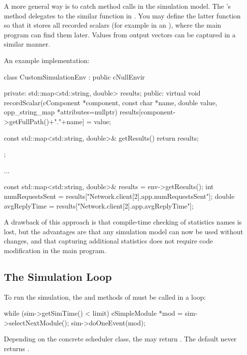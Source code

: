 A more general way is to catch  method calls in the
simulation model. The 's  method
delegates to the similar function in . You may define the
latter function so that it stores all recorded scalars (for example in an
), where the main program can find them later.
Values from output vectors can be captured in a similar manner.

An example implementation:

\begin{cpp}
class CustomSimulationEnv : public cNullEnvir
{
  private:
    std::map<std::string, double> results;
  public:
    virtual void recordScalar(cComponent *component, const char *name,
                              double value, opp_string_map *attributes=nullptr)
    {
       results[component->getFullPath()+"."+name] = value;
    }

    const std::map<std::string, double>& getResults() {return results;}
};

...

const std::map<std::string, double>& results = env->getResults();
int numRequestsSent = results["Network.client[2].app.numRequestsSent"];
double avgReplyTime = results["Network.client[2].app.avgReplyTime"];
\end{cpp}

A drawback of this approach is that compile-time checking of statistics names is lost, but
the advantages are that any simulation model can now be used
without changes, and that capturing additional statistics does not require
code modification in the main program.


\subsection{The Simulation Loop}
\label{sec:embedding:simulation-loop}

To run the simulation, the  and 
methods of  must be called in a loop:

\begin{cpp}
while (sim->getSimTime() < limit)
{
    cSimpleModule *mod = sim->selectNextModule();
    sim->doOneEvent(mod);
}
\end{cpp}

Depending on the concrete scheduler class, the
 may return . The default
 never returns .

